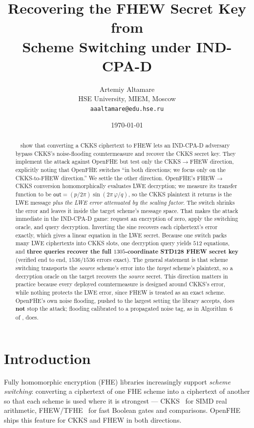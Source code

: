 \documentclass[11pt]{article}
\title{\bfseries Recovering the FHEW Secret Key from \fto{}\\ Scheme Switching under IND-CPA-D}
\author{%
  Artemiy Altamare\\[2pt]
  \small HSE University, MIEM, Moscow\\
  \small \texttt{aaaltamare@edu.hse.ru}%
}
\date{\today}
\newcommand{\fto}{\texorpdfstring{FHEW$\to$CKKS}{FHEW-to-CKKS}}
\newcommand{\ctf}{\texorpdfstring{CKKS$\to$FHEW}{CKKS-to-FHEW}}
\newcommand{\out}{\mathsf{out}}
\begin{document}
\maketitle

\begin{abstract}
\citeauthor{santato2026}~\cite{santato2026} show that converting a CKKS ciphertext to FHEW
lets an IND-CPA-D adversary bypass CKKS's noise-flooding countermeasure and recover the CKKS
secret key. They implement the attack against OpenFHE but test only the \ctf{} direction,
explicitly noting that OpenFHE switches ``in both directions; we focus only on the
CKKS-to-FHEW direction.'' We settle the other direction. OpenFHE's \fto{} conversion
homomorphically evaluates LWE decryption; we measure its transfer function to be
$\out = (p/2\pi)\sin(2\pi\,\varphi/q)$, so the CKKS plaintext it returns is the LWE message
\emph{plus the LWE error attenuated by the scaling factor}. The switch shrinks the error and
leaves it inside the target scheme's message space. That makes
the attack immediate in the IND-CPA-D game: request an encryption of zero, apply the switching
oracle, and query decryption. Inverting the sine recovers each ciphertext's error exactly,
which gives a linear equation in the LWE secret. Because one switch packs many LWE ciphertexts
into CKKS slots, one decryption query yields $512$ equations, and \textbf{three queries recover
the full $1305$-coordinate STD128 FHEW secret key} (verified end to end, $1536/1536$ errors
exact). The general statement is that scheme switching transports the \emph{source} scheme's
error into the \emph{target} scheme's plaintext, so a decryption oracle on the target recovers
the \emph{source} secret. This direction matters in practice because every deployed
countermeasure is designed around CKKS's error, while nothing protects the LWE error, since FHEW is
treated as an exact scheme. OpenFHE's own
noise flooding, pushed to the largest setting the library accepts, does \textbf{not} stop the
attack; flooding calibrated to a propagated noise tag, as in Algorithm~6 of
\cite{santato2026}, does.
\end{abstract}

\section{Introduction}

Fully homomorphic encryption (FHE) libraries increasingly support \emph{scheme switching}:
converting a ciphertext of one FHE scheme into a ciphertext of another so that each scheme is
used where it is strongest --- CKKS~\cite{cheon2017} for SIMD real arithmetic, FHEW/TFHE~\cite{ducas2015}
for fast Boolean gates and comparisons. OpenFHE~\cite{openfhe} ships this feature for CKKS and FHEW in
both directions.
\end{document}
